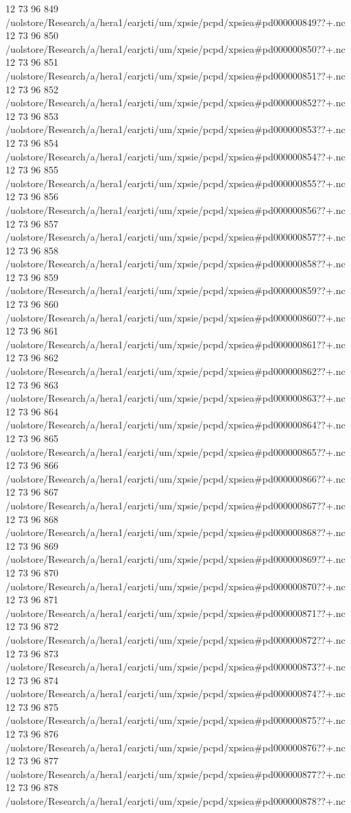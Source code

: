 12 73 96
849
/uolstore/Research/a/hera1/earjcti/um/xpsie/pcpd/xpsiea#pd000000849??+.nc
12 73 96
850
/uolstore/Research/a/hera1/earjcti/um/xpsie/pcpd/xpsiea#pd000000850??+.nc
12 73 96
851
/uolstore/Research/a/hera1/earjcti/um/xpsie/pcpd/xpsiea#pd000000851??+.nc
12 73 96
852
/uolstore/Research/a/hera1/earjcti/um/xpsie/pcpd/xpsiea#pd000000852??+.nc
12 73 96
853
/uolstore/Research/a/hera1/earjcti/um/xpsie/pcpd/xpsiea#pd000000853??+.nc
12 73 96
854
/uolstore/Research/a/hera1/earjcti/um/xpsie/pcpd/xpsiea#pd000000854??+.nc
12 73 96
855
/uolstore/Research/a/hera1/earjcti/um/xpsie/pcpd/xpsiea#pd000000855??+.nc
12 73 96
856
/uolstore/Research/a/hera1/earjcti/um/xpsie/pcpd/xpsiea#pd000000856??+.nc
12 73 96
857
/uolstore/Research/a/hera1/earjcti/um/xpsie/pcpd/xpsiea#pd000000857??+.nc
12 73 96
858
/uolstore/Research/a/hera1/earjcti/um/xpsie/pcpd/xpsiea#pd000000858??+.nc
12 73 96
859
/uolstore/Research/a/hera1/earjcti/um/xpsie/pcpd/xpsiea#pd000000859??+.nc
12 73 96
860
/uolstore/Research/a/hera1/earjcti/um/xpsie/pcpd/xpsiea#pd000000860??+.nc
12 73 96
861
/uolstore/Research/a/hera1/earjcti/um/xpsie/pcpd/xpsiea#pd000000861??+.nc
12 73 96
862
/uolstore/Research/a/hera1/earjcti/um/xpsie/pcpd/xpsiea#pd000000862??+.nc
12 73 96
863
/uolstore/Research/a/hera1/earjcti/um/xpsie/pcpd/xpsiea#pd000000863??+.nc
12 73 96
864
/uolstore/Research/a/hera1/earjcti/um/xpsie/pcpd/xpsiea#pd000000864??+.nc
12 73 96
865
/uolstore/Research/a/hera1/earjcti/um/xpsie/pcpd/xpsiea#pd000000865??+.nc
12 73 96
866
/uolstore/Research/a/hera1/earjcti/um/xpsie/pcpd/xpsiea#pd000000866??+.nc
12 73 96
867
/uolstore/Research/a/hera1/earjcti/um/xpsie/pcpd/xpsiea#pd000000867??+.nc
12 73 96
868
/uolstore/Research/a/hera1/earjcti/um/xpsie/pcpd/xpsiea#pd000000868??+.nc
12 73 96
869
/uolstore/Research/a/hera1/earjcti/um/xpsie/pcpd/xpsiea#pd000000869??+.nc
12 73 96
870
/uolstore/Research/a/hera1/earjcti/um/xpsie/pcpd/xpsiea#pd000000870??+.nc
12 73 96
871
/uolstore/Research/a/hera1/earjcti/um/xpsie/pcpd/xpsiea#pd000000871??+.nc
12 73 96
872
/uolstore/Research/a/hera1/earjcti/um/xpsie/pcpd/xpsiea#pd000000872??+.nc
12 73 96
873
/uolstore/Research/a/hera1/earjcti/um/xpsie/pcpd/xpsiea#pd000000873??+.nc
12 73 96
874
/uolstore/Research/a/hera1/earjcti/um/xpsie/pcpd/xpsiea#pd000000874??+.nc
12 73 96
875
/uolstore/Research/a/hera1/earjcti/um/xpsie/pcpd/xpsiea#pd000000875??+.nc
12 73 96
876
/uolstore/Research/a/hera1/earjcti/um/xpsie/pcpd/xpsiea#pd000000876??+.nc
12 73 96
877
/uolstore/Research/a/hera1/earjcti/um/xpsie/pcpd/xpsiea#pd000000877??+.nc
12 73 96
878
/uolstore/Research/a/hera1/earjcti/um/xpsie/pcpd/xpsiea#pd000000878??+.nc
